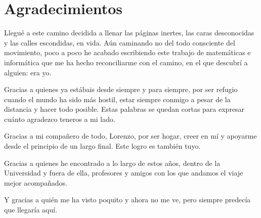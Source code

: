 

\chapter{Agradecimientos}

Llegué a este camino decidida a llenar las páginas inertes, las caras desconocidas y las calles escondidas, en vida. Aún caminando no del todo consciente del movimiento, poco a poco he acabado escribiendo este trabajo de matemáticas e informática que me ha hecho reconciliarme con el camino, en el que descubrí a alguien: era yo.
\vspace{5pt}

Gracias a quienes ya estábais desde siempre y para siempre, por ser refugio cuando el mundo ha sido más hostil, estar siempre conmigo a pesar de la distancia y hacer todo posible. Estas palabras se quedan cortas para expresar cuánto agradezco teneros a mi lado.
\vspace{5pt}

Gracias a mi compañero de todo, Lorenzo, por ser hogar, creer en mí y apoyarme desde el principio de un largo final. Este logro es también tuyo.
\vspace{5pt}

Gracias a quienes he encontrado a lo largo de estos años, dentro de la Universidad y fuera de ella, profesores y amigos con los que andamos el viaje mejor acompañados. 
\vspace{5pt}

Y gracias a quién me ha visto poquito y ahora no me ve, pero siempre predecía que llegaría aquí.



\cleardoublepage
\endinput
